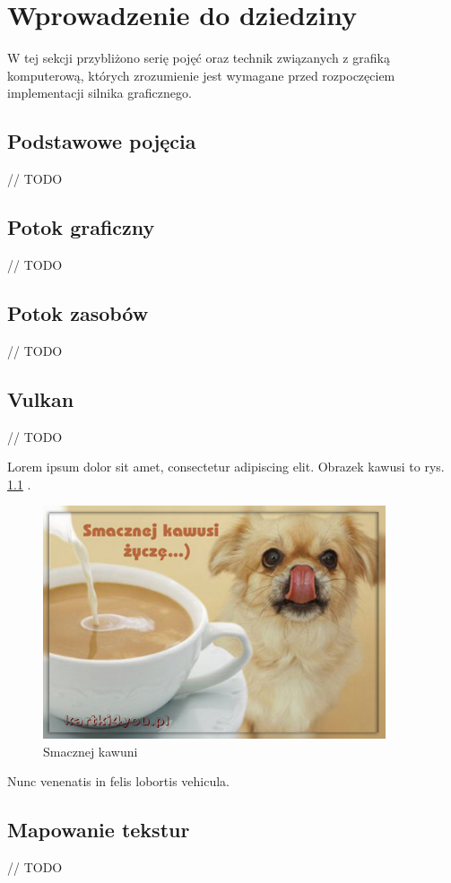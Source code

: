 \chapter{Wprowadzenie do dziedziny}
\label{chap:field}

W tej sekcji przybliżono serię pojęć oraz technik związanych z grafiką komputerową, których zrozumienie jest wymagane przed rozpoczęciem implementacji silnika graficznego.

\section{Podstawowe pojęcia}
// TODO

\section{Potok graficzny}
// TODO

\section{Potok zasobów}
// TODO

\section{Vulkan}

// TODO

Lorem ipsum dolor sit amet, consectetur adipiscing elit.
Obrazek kawusi to rys. \ref{fig:coffee} \cite{dx12_2}.

\begin{figure}[htbp]
    \centering
    \includegraphics[width=0.9\textwidth]{images/kawunia.png}
    \caption{Smacznej kawuni}
    \label{fig:coffee}
\end{figure}

Nunc venenatis in felis lobortis vehicula.

\section{Mapowanie tekstur}

// TODO
